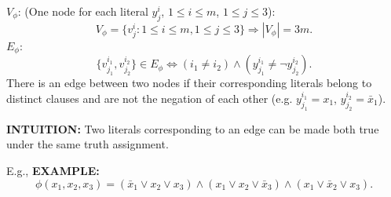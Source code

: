 $V_\phi$: (One node for each literal $y_j^i$, $1\leq i\leq m$, $1\leq j\leq3$):
\[V_\phi=\{v_j^i:1\leq i\leq m,1\leq j\leq3\}\Rightarrow|V_\phi|=3m.\]
$E_\phi$:
\[
\{v_{j_1}^{i_1},v_{j_2}^{i_2}\}\in E_\phi\Longleftrightarrow(i_1\neq i_2)\land(y_{j_1}^{i_1}\neq\neg y_{j_2}^{i_2}).
\]
There is an edge between two nodes if their corresponding literals belong to distinct clauses and are not the negation of each other (e.g. $y_{j_1}^{i_1}=x_1$, $y_{j_2}^{i_2}=\bar x_1$).

\textbf{INTUITION:} Two literals corresponding to an edge can be made both true under the same truth assignment.

E.g.,
\textbf{EXAMPLE:}
\[
\phi(x_1,x_2,x_3)=(\bar x_1\lor x_2\lor x_3)\land(x_1\lor x_2\lor\bar x_3)\land(x_1\lor\bar x_2\lor x_3).
\]
